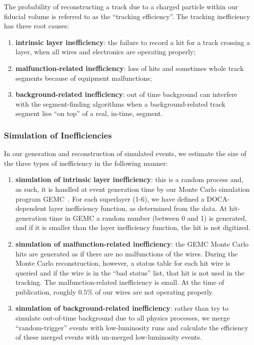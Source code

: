 The probability of reconstructing a track due to a charged particle within our fiducial volume
is referred to as the ``tracking efficiency''. The tracking inefficiency has three root causes:

\begin{enumerate}
\item {\bf intrinsic layer inefficiency}: the failure to record
a hit for a track crossing a layer, when all wires and electronics
are operating properly;
\item {\bf malfunction-related inefficiency}: loss of hits and sometimes
whole track segments because of equipment malfunctions;
\item {\bf background-related inefficiency}: out of time background
can interfere with the segment-finding algorithms when a background-related
track segment lies ``on top'' of a real, in-time, segment.
\end{enumerate}

\subsubsection{Simulation of Inefficiencies}

In our generation and reconstruction of simulated events, we estimate the size of
the three types of inefficiency in the following manner:

\begin{enumerate}
\item {\bf simulation of intrinsic layer inefficiency}: this is a random process
and, as such, it is handled at event generation time by our Monte Carlo simulation
program GEMC~\cite{sim-nim}.  For each superlayer (1-6), we have defined a DOCA-dependent
layer inefficiency function, as determined from the data.  At hit-generation
time in GEMC a random number (between 0 and 1) is generated, and if it is
smaller than the layer inefficiency function, the hit is not digitized.
\item {\bf simulation of malfunction-related inefficiency}: the GEMC Monte
Carlo hits are generated as if there are no malfunctions of the wires.
During the Monte Carlo reconstruction, however, a status table for each
hit wire is queried and if the wire is in the ``bad status'' list, that
hit is not used in the tracking.  The malfunction-related inefficiency  is small.  
At the time of publication, roughly $0.5\%$ of our wires are not operating properly.  
\item {\bf simulation of background-related inefficiency}: rather than try
to simulate out-of-time background due to all physics processes, we merge
``random-trigger'' events with low-luminosity runs and calculate the
efficiency of these merged events with un-merged low-luminosity events.
\end{enumerate}


